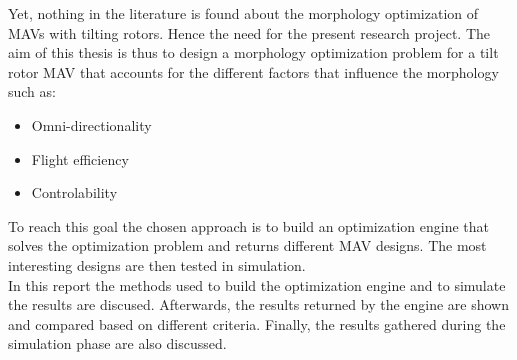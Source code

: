 Yet, nothing in the literature is found about the morphology optimization
of MAVs with tilting rotors. Hence the need for the present research project.
The aim of this thesis is thus to design a morphology optimization problem for
a tilt rotor MAV that accounts for the different factors that influence the
morphology such as:

\begin{itemize}
\item Omni-directionality
\item Flight efficiency
\item Controlability
\end{itemize}

To reach this goal the chosen approach is to build an optimization engine that solves
the optimization problem and returns different MAV designs. The most interesting
designs are then tested in simulation.\\
In this report the methods used to build the optimization engine and to simulate
the results are discused. Afterwards, the results returned by the engine are shown
and compared based on different criteria. Finally, the results gathered during
the simulation phase are also discussed.
